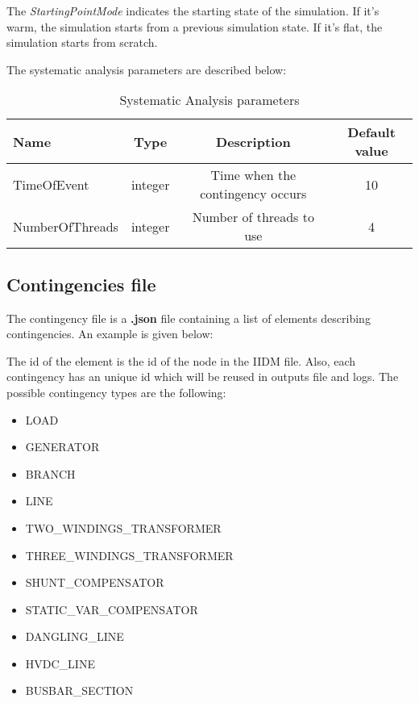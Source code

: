 \documentclass[a4paper, 12pt]{report}
\begin{document}
The \textit{StartingPointMode} indicates the starting state of the simulation. If it's warm, the simulation starts from a previous simulation state. If it's flat, the simulation starts from scratch.

\begin{table}[H]
The systematic analysis parameters are described below:
\center
\begin{tabular}{ l | c | c | c }
\toprule
\textbf{{Name}} & \textbf{{Type}} & \textbf{{Description}} & \textbf{{Default value}}\\
\midrule
\rowcolor{white}
TimeOfEvent & integer & Time when the contingency occurs & 10 \\
\rowcolor{gray!10}
NumberOfThreads & integer & Number of threads to use & 4 \\
\bottomrule
\end{tabular}
\caption{Systematic Analysis parameters}
\end{table}

\subsection{Contingencies file}

The contingency file is a \textbf{.json} file containing a list of elements describing contingencies. An example is given below:


The id of the element is the id of the node in the IIDM file.
Also, each contingency has an unique id which will be reused in outputs file and logs.
The possible contingency types are the following:
\begin{itemize}
  \item LOAD
  \item GENERATOR
  \item BRANCH
  \item LINE
  \item TWO\_WINDINGS\_TRANSFORMER
  \item THREE\_WINDINGS\_TRANSFORMER
  \item SHUNT\_COMPENSATOR
  \item STATIC\_VAR\_COMPENSATOR
  \item DANGLING\_LINE
  \item HVDC\_LINE
  \item BUSBAR\_SECTION
\end{itemize}
\end{document}
